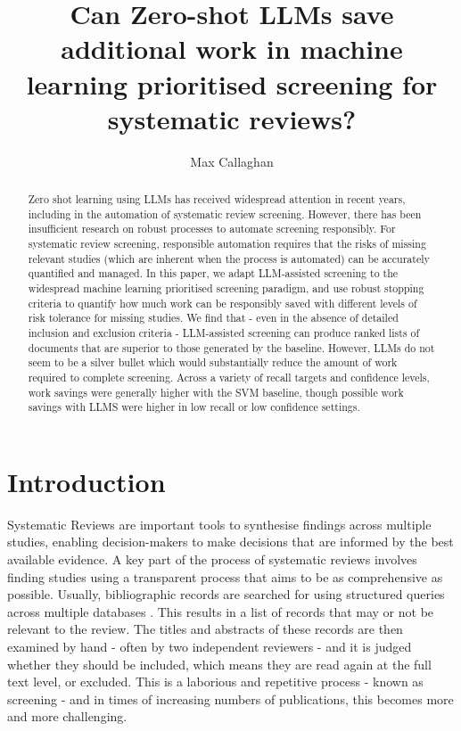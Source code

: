 \documentclass{article}
\title{Can Zero-shot LLMs save additional work in machine learning prioritised screening for systematic reviews?}
\author[1,2]{Max Callaghan}
\affil[1]{Mercator Research Institute on Global Commons and Climate Change, Torgauer Straße 12-15, 10829 Berlin, Germany}
\affil[2]{%
	Potsdam Institute for Climate Impact Research (PIK), Member of the Leibniz Association, P.O. Box 60 12 03, 14412 Potsdam, Germany
}
\begin{document}
	\maketitle
	
	\doublespacing
	
	\begin{abstract}
		Zero shot learning using LLMs has received widespread attention in recent years, including in the automation of systematic review screening. 
		However, there has been insufficient research on robust processes to automate screening responsibly. 
		For systematic review screening, responsible automation requires that the risks of missing relevant studies (which are inherent when the process is automated) can be accurately quantified and managed.
		In this paper, we adapt LLM-assisted screening to the widespread machine learning prioritised screening paradigm, and use robust stopping criteria to quantify how much work can be responsibly saved with different levels of risk tolerance for missing studies.
		We find that - even in the absence of detailed inclusion and exclusion criteria - LLM-assisted screening can produce ranked lists of documents that are superior to those generated by the baseline.
		However, LLMs do not seem to be a silver bullet which would substantially reduce the amount of work required to complete screening. Across a variety of recall targets and confidence levels, work savings were generally higher with the SVM baseline, though possible work savings with LLMS were higher in low recall or low confidence settings. 
	\end{abstract}

	\section*{Introduction}
	
	Systematic Reviews are important tools to synthesise findings across multiple studies, enabling decision-makers to make decisions that are informed by the best available evidence. 
	A key part of the process of systematic reviews involves finding studies using a transparent process that aims to be as comprehensive as possible. 
	Usually, bibliographic records are searched for using structured queries across multiple databases \cite{lefebvre_chapter_2023}.
	This results in a list of records that may or not be relevant to the review. The titles and abstracts of these records are then examined by hand - often by two independent reviewers - and it is judged whether they should be included, which means they are read again at the full text level, or excluded.
	This is a laborious and repetitive process - known as screening - and in times of increasing numbers of publications, this becomes more and more challenging. 
	
\end{document}
